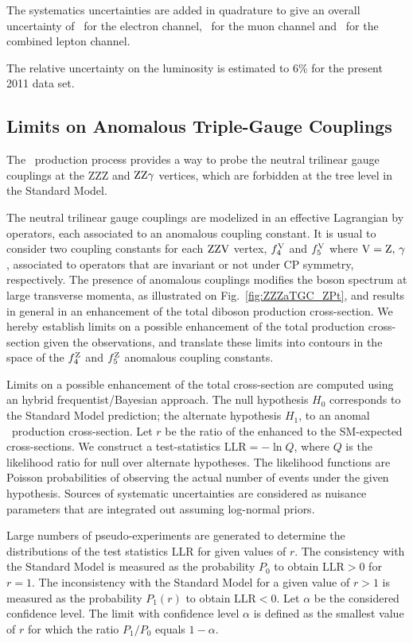 The systematics uncertainties are added in quadrature to give an overall uncertainty of \GlobSystElec\ for the electron channel, \GlobSystMuon\ for the muon channel and \GlobSystComb\ for the combined lepton channel.

The relative uncertainty on the luminosity is estimated to 6\% for the present 2011 data set.

\subsection{Limits on Anomalous Triple-Gauge Couplings}

The \ZZ\ production process provides a way to probe the neutral trilinear gauge couplings at the ZZZ and $\mathrm{Z}\mathrm{Z}\gamma$ vertices, which are forbidden at the tree level in the Standard Model.

The neutral trilinear gauge couplings are modelized in an effective Lagrangian by operators, each associated to an anomalous coupling constant.  It is usual to consider two coupling constants for each $\mathrm{Z}\mathrm{Z}\mathrm{V}$ vertex,  $f_{4}^{\mathrm{V}}$ and $f_{5}^{\mathrm{V}}$ where $\mathrm{V} = \mathrm{Z},\, \gamma$, associated to operators that are invariant or not under CP symmetry, respectively.  The presence of anomalous couplings modifies the boson spectrum at large transverse momenta, as illustrated on Fig.~\ref{fig:ZZZaTGC_ZPt}, and results in general in an enhancement of the total diboson production cross-section.  We hereby establish limits on a possible enhancement of the total production cross-section given the observations, and translate these limits into contours in the space of the $f_{4}^{\mathrm{Z}}$ and $f_{5}^{\mathrm{Z}}$ anomalous coupling constants.

Limits on a possible enhancement of the total cross-section are computed using an hybrid frequentist/Bayesian approach. The null hypothesis $H_0$  corresponds to the Standard Model prediction; the alternate hypothesis $H_1$, to an anomal \ZZ\ production cross-section. Let $r$ be the ratio of the enhanced to the SM-expected cross-sections.  We construct a test-statistics $\mbox{LLR}=-\ln{Q}$, where $Q$ is the likelihood ratio for null over alternate hypotheses. The likelihood functions are Poisson probabilities of observing the actual number of events under the given hypothesis. Sources of systematic uncertainties are considered as nuisance parameters that are integrated out assuming log-normal priors. 

Large numbers of pseudo-experiments are generated to determine the distributions of the test statistics $\mbox{LLR}$ for given values of $r$.  The consistency with the Standard Model is measured as the probability $P_0$ to obtain $\mbox{LLR}>0$ for $r=1$. The inconsistency with the Standard Model for a given value of $r>1$ is measured as the probability $P_1(r)$ to obtain $\mbox{LLR}<0$. Let $\alpha$ be the considered confidence level.  The limit with confidence level $\alpha$ is defined as the smallest value of $r$ for which the ratio $P_1/P_0$ equals $1-\alpha$.  

